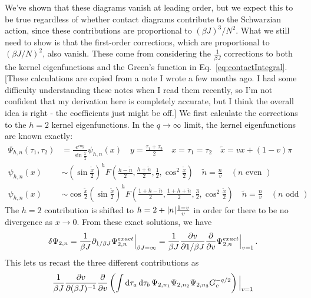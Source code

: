 \documentclass[aps,prx,preprint,onecolumn,citeautoscript,footinbib]{revtex4-1}
\renewcommand{\tilde}{\widetilde}
\newcommand{\note}[1]{{\color{red}[#1]}}
\begin{document}
We've shown that these diagrams vanish at leading order, but we expect this to be true regardless of whether contact diagrams contribute to the Schwarzian action, since these contributions are proportional to $(\beta J)^3/N^2$. What we still need to show is that the first-order corrections, which are proportional to $(\beta J/N)^2$, also vanish. These come from considering the $\frac{1}{\beta J}$ corrections to both the kernel eigenfunctions and the Green's function in Eq.~\ref{eq:contactIntegral}.  \note{These calculations are copied from a note I wrote a few months ago. I had some difficulty understanding these notes when I read them recently, so I'm not confident that my derivation here is completely accurate, but I think the overall idea is right - the coefficients just might be off.}  We first calculate the corrections to the $h=2$ kernel eigenfunctions. In the $q \rightarrow \infty$ limit, the kernel eigenfunctions are known exactly:
\begin{equation}
    \begin{aligned}
        \Psi_{h, n}(\tau_1, \tau_2) &= \frac{e^{iny}}{\sin\frac{\tilde{x}}{2}} \psi_{h, n}(x) \quad y = \frac{\tau_1 + \tau_2}{2} \quad x = \tau_1 = \tau_2 \quad \tilde{x} = v x + (1-v)\pi
  \\
  \psi_{h,n}(x) &\sim \left( \sin\frac{\tilde{x}}{2} \right)^h F\left( \frac{h-\tilde{n}}{2}, \frac{h + \tilde{n}}{2}, \frac{1}{2}, \cos^2\frac{\tilde{x}}{2} \right) \quad \tilde{n} = \frac{n}{v} \quad (n \text{ even })
  \\
  \psi_{h,n}(x) &\sim \cos \frac{\tilde{x}}{2} \left( \sin\frac{\tilde{x}}{2} \right)^h F\left( \frac{1+h-\tilde{n}}{2}, \frac{1+h + \tilde{n}}{2}, \frac{3}{2}, \cos^2\frac{\tilde{x}}{2} \right) \quad \tilde{n} = \frac{n}{v} \quad (n \text{ odd })\end{aligned}
\end{equation}
The $h=2$ contribution is shifted to $h=2 + \abs{n} \frac{1-v}{v}$ in order for there to be no divergence as $x \rightarrow 0$.
From these exact solutions, we have
\begin{equation}
    \delta \Psi_{2, n} = \frac{1}{\beta J} \partial_{1/\beta J} \Psi^{exact}_{2,n}\Big|_{\beta J = \infty} = \frac{1}{\beta J} \pdv{v}{1/\beta J} \pdv{v} \Psi^{exact}_{2,n}\Big|_{v=1}\,.
\end{equation}
This lets us recast the three different contributions as
\begin{equation}
    \frac{1}{\beta J} \pdv{v}{(\beta J)^{-1}} \pdv{v}\left( \int \dd{\tau_a} \dd{\tau_b}   \Psi_{2, n_1} \Psi_{2, n_2}\Psi_{2, n_3} G_c^{-q/2}\right) \Big|_{v=1}
\end{equation}
\end{document}

